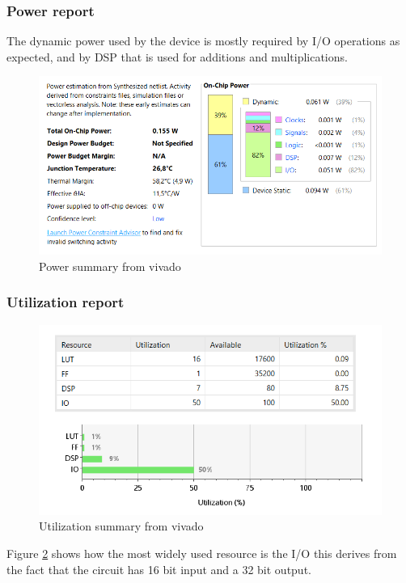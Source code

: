 \subsubsection{Power report} %
The dynamic power used by the device is mostly required by I/O operations as expected, and by DSP that is used for additions and multiplications.
\label{sub:power_report}
\begin{figure}[H]
  \centering
  \includegraphics[width=0.9\linewidth]{./images/power.PNG}
  \caption{Power summary from vivado}
  \label{fig:power}
\end{figure}

\subsubsection{Utilization report} %
\label{ssub:utilization_report}
\begin{figure}[H]
  \centering
  \includegraphics[width=0.9\linewidth]{./images/utilization.PNG}
  \caption{Utilization summary from vivado}
  \label{fig:utilization}
\end{figure}
Figure \ref{fig:utilization} shows how the most widely used resource is the I/O this derives from the fact that the circuit has 16 bit input and a 32 bit output.
